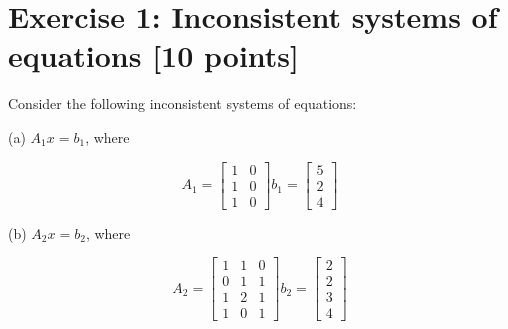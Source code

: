 \documentclass[unicode,11pt,a4paper,oneside,numbers=endperiod,openany]{scrartcl}
\begin{document}
\setassignment
{}

\newline

\assignmentpolicy


\newpage

\section*{Exercise 1: Inconsistent systems of equations [10 points]}
Consider the following inconsistent systems of equations: \\

\begin{center}
(a) ${A_1x = b_1}$, where

\vspace{10px}

\begin{equation*}
A_1 =
\begin{bmatrix}
1 & 0 \\
1 & 0 \\
1 & 0
\end{bmatrix}
b_1=
\begin{bmatrix}
5 \\
2 \\
4
\end{bmatrix}
\end{equation*}
\end{center}

\begin{center}
(b) ${A_2x = b_2}$, where

\vspace{10px}

\begin{equation*}
A_2 =
\begin{bmatrix}
1 & 1 & 0 \\
0 & 1 & 1 \\
1 & 2 & 1 \\
1 & 0 & 1
\end{bmatrix}
b_2=
\begin{bmatrix}
2 \\
2 \\
3 \\
4
\end{bmatrix}
\end{equation*}
\end{center}
\end{document}
